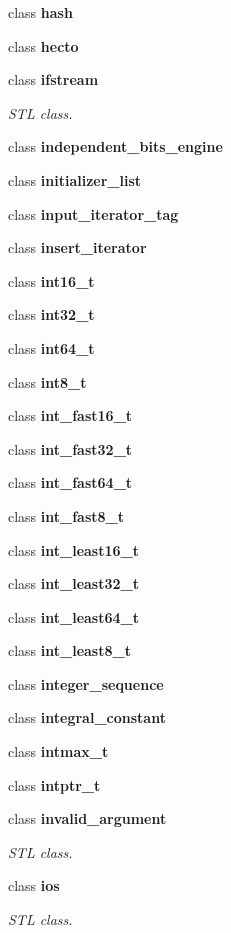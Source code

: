 \begin{DoxyCompactItemize}
\item 
class \textbf{ hash}
\item 
class \textbf{ hecto}
\item 
class \textbf{ ifstream}
\begin{DoxyCompactList}\small\item\em S\+TL class. \end{DoxyCompactList}\item 
class \textbf{ independent\+\_\+bits\+\_\+engine}
\item 
class \textbf{ initializer\+\_\+list}
\item 
class \textbf{ input\+\_\+iterator\+\_\+tag}
\item 
class \textbf{ insert\+\_\+iterator}
\item 
class \textbf{ int16\+\_\+t}
\item 
class \textbf{ int32\+\_\+t}
\item 
class \textbf{ int64\+\_\+t}
\item 
class \textbf{ int8\+\_\+t}
\item 
class \textbf{ int\+\_\+fast16\+\_\+t}
\item 
class \textbf{ int\+\_\+fast32\+\_\+t}
\item 
class \textbf{ int\+\_\+fast64\+\_\+t}
\item 
class \textbf{ int\+\_\+fast8\+\_\+t}
\item 
class \textbf{ int\+\_\+least16\+\_\+t}
\item 
class \textbf{ int\+\_\+least32\+\_\+t}
\item 
class \textbf{ int\+\_\+least64\+\_\+t}
\item 
class \textbf{ int\+\_\+least8\+\_\+t}
\item 
class \textbf{ integer\+\_\+sequence}
\item 
class \textbf{ integral\+\_\+constant}
\item 
class \textbf{ intmax\+\_\+t}
\item 
class \textbf{ intptr\+\_\+t}
\item 
class \textbf{ invalid\+\_\+argument}
\begin{DoxyCompactList}\small\item\em S\+TL class. \end{DoxyCompactList}\item 
class {\bfseries ios}
\begin{DoxyCompactList}\small\item\em S\+TL class. \end{DoxyCompactList}\item 

\end{DoxyCompactItemize}
